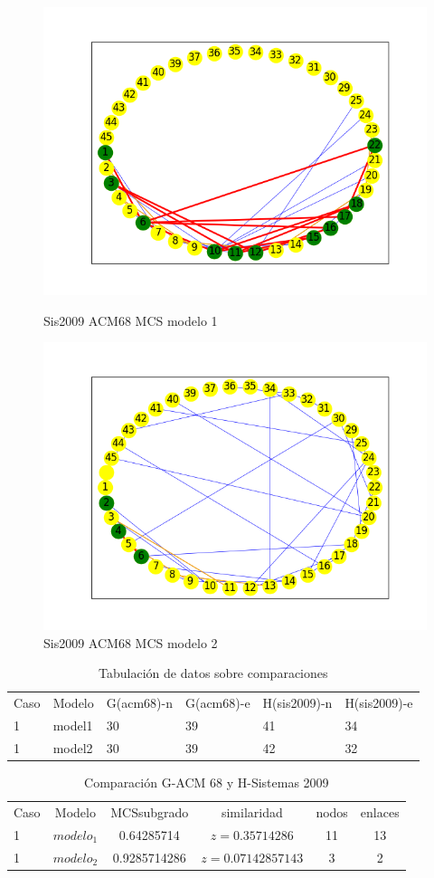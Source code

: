 \begin{figure}[H]
\centering
\includegraphics[width=0.7\linewidth]{images/sis2009/H_sis2009_cmp_acm68_m1_mcs_mix}
\caption{Sis2009 ACM68 MCS modelo 1}
\label{fig:modelo1}


\includegraphics[width=0.7\linewidth]{images/sis2009/H_sis2009_cmp_acm68_m2_mcs_mix}
\caption{Sis2009 ACM68 MCS modelo 2}
\label{fig:modelo2}

\end{figure}

\begin{table}[H]
\centering
\caption{Tabulación de datos sobre comparaciones}
\begin{tabular}[t]{|l|l|l|l|l|l|}
\hline
Caso & Modelo & G(acm68)-n & G(acm68)-e & H(sis2009)-n & H(sis2009)-e\\
1&model1&30&39&41&34\\
\hline
1&model2&30&39&42&32\\
\hline
\end{tabular}
\label{tab:tabcomparaciones_P2}
\end{table}


\begin{table}[H]
\centering
\caption{Comparación G-ACM 68 y H-Sistemas 2009}
\begin{tabular}[t]{lccccc}
\hline
Caso & Modelo & MCSsubgrado & similaridad & nodos & enlaces \\
1 & $modelo_1 $ & 0.64285714 & $z=0.35714286$ & 11 & 13\\
1 & $modelo_2 $& 0.9285714286 & $z=0.07142857143$ & 3 & 2\\
\hline

\end{tabular}
\label{tab:tabcomparaciones_P2}
\end{table}

